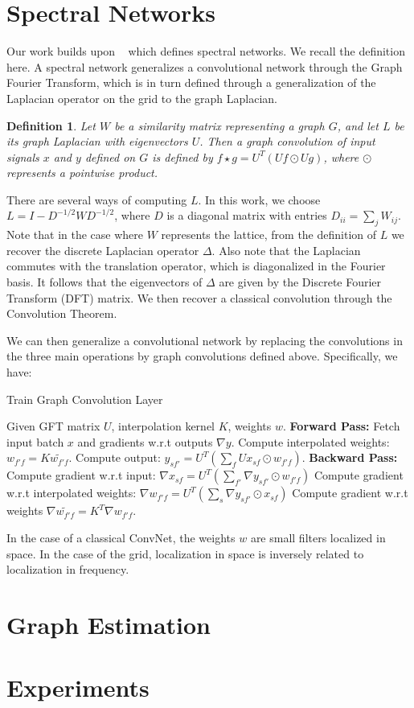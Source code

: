 \documentclass{article} %
\newtheorem{graphconv}{Definition}
\begin{document}
\section{Spectral Networks}

Our work builds upon ~\cite{spectralnet2013} which defines spectral networks. We recall the definition here. A spectral network generalizes a convolutional network through the Graph Fourier Transform, which is in turn defined through a generalization of the Laplacian operator on the grid to the graph Laplacian.

\begin{graphconv}
 Let $W$ be a similarity matrix representing a graph $G$, and let $L$ be its graph Laplacian with eigenvectors $U$. Then a \textit{graph convolution} of input signals $x$ and $y$ defined on $G$ is defined by $f \star g = U^T \left( Uf \odot Ug \right)$, where $\odot$ represents a pointwise product. 
\end{graphconv}

There are several ways of computing $L$. In this work, we choose $L = I - D^{-1/2}WD^{-1/2}$, where $D$ is a diagonal matrix with entries $D_{ii} = \sum_j W_{ij}$. Note that in the case where $W$ represents the lattice, from the definition of $L$ we recover the discrete Laplacian operator $\Delta$. Also note that the Laplacian commutes with the translation operator, which is diagonalized in the Fourier basis. 
It follows that the eigenvectors of $\Delta$ are given by the Discrete Fourier Transform (DFT) matrix. 
We then recover a classical convolution through the Convolution Theorem. 

We can then generalize a convolutional network by replacing the convolutions in the three main operations by graph convolutions defined above. 
Specifically, we have:

\begin{algorithm}
\caption{Train Graph Convolution Layer}
\label{pseudoPSO}
\begin{algorithmic}[1]
\State Given GFT matrix $U$, interpolation kernel $K$, weights $w$. 
\State \textbf{Forward Pass:}
  \State Fetch input batch $x$ and gradients w.r.t outputs $\nabla y$.
  \State Compute interpolated weights: $w_{f'f} = K \tilde{w_{f'f}}$.
  \State Compute output: $y_{sf'} = U^T\left(\sum_{f} Ux_{sf} \odot w_{f'f} \right)$.
  \State \textbf{Backward Pass:}
  \State Compute gradient w.r.t input: $\nabla x_{sf} = U^T\left(\sum_{f'} \nabla y_{sf'} \odot w_{f'f} \right)$
  \State Compute gradient w.r.t interpolated weights: $\nabla w_{f'f} = U^T\left(\sum_s \nabla y_{sf'} \odot x_{sf} \right)$
  \State Compute gradient w.r.t weights $\nabla \tilde{w_{f'f}} = K^T \nabla w_{f'f}$.
\end{algorithmic}
\end{algorithm}

In the case of a classical ConvNet, the weights $w$ are small filters localized in space.
In the case of the grid, localization in space is inversely related to localization in frequency. 

\section{Graph Estimation }


\section{Experiments}




{}

\end{document}
